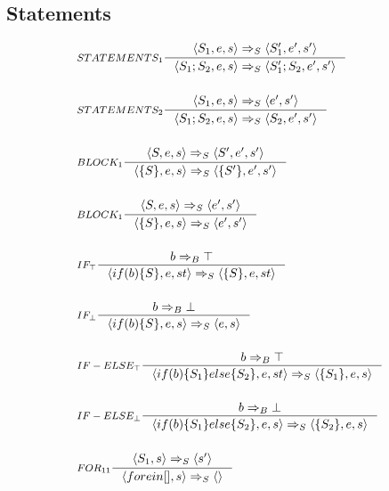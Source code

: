 \subsection{Statements}
\begin{align*}
&\inference[$STATEMENTS_1$]{\Braket{S_1,e,s} \Rightarrow_S \Braket{S_1',e',s'}}
                         {\Braket{S_1;S_2,e,s} \Rightarrow_S \Braket{S_1';S_2,e',s'}}
\\\\
&\inference[$STATEMENTS_2$]{\Braket{S_1,e,s} \Rightarrow_S \Braket{e',s'}}
                         {\Braket{S_1;S_2,e,s} \Rightarrow_S \Braket{S_2,e',s'}}
\\\\
&\inference[$BLOCK_1$]{\Braket{S,e,s} \Rightarrow_S \Braket{S',e',s'}}
                         {\Braket{\{S\},e,s} \Rightarrow_S \Braket{\{S'\},e',s'}}
\\\\
&\inference[$BLOCK_1$]{\Braket{S,e,s} \Rightarrow_S \Braket{e',s'}}
                         {\Braket{\{S\},e,s} \Rightarrow_S \Braket{e',s'}}
\\\\
&\inference[$IF_\top$]{b \Rightarrow_B \top}
                      {\Braket{if(b)\{S\},e,st} \Rightarrow_S \Braket{\{S\},e,st}}
\\\\
&\inference[$IF_\bot$]{b \Rightarrow_B \bot}
                      {\Braket{if(b)\{S\},e,s} \Rightarrow_S \Braket{e,s}}
\\\\
&\inference[$IF-ELSE_\top$]{b \Rightarrow_B \top}
                      {\Braket{if(b)\{S_1\}else\{S_2\},e,st} \Rightarrow_S \Braket{\{S_1\},e,s}}
\\\\
&\inference[$IF-ELSE_\bot$]{b \Rightarrow_B \bot}
                      {\Braket{if(b)\{S_1\}else\{S_2\},e,s} \Rightarrow_S \Braket{\{S_2\},e,s}}
\\\\
&\inference[$FOR_{11}$]{\Braket{S_1,s} \Rightarrow_S \Braket{s'}}
                       {\Braket{for e in [], s} \Rightarrow_S \Braket{}}
\end{align*}